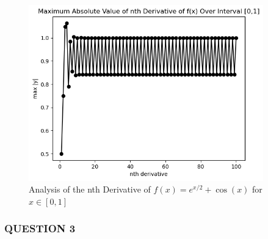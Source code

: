 \documentclass{article}
\begin{document}
\begin{enumerate}
                \begin{figure}[h]
                    \centering
                    \includegraphics[width=4in]{./Quest2d.png}
                    \caption{Analysis of the nth Derivative of $f(x)=e^{x/2}+\cos(x)$ for $x \in [0,1]$}
                    \label{fig:image3}
                \end{figure}

\end{enumerate}


\subsubsection*{QUESTION 3}

\vspace{10pt}
\end{document}
